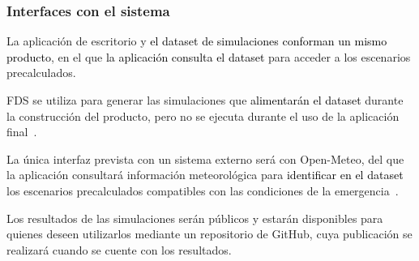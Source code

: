 \subsubsection{Interfaces con el sistema}{\color{black}La aplicación de escritorio y \textcolor{black}{el dataset de simulaciones conforman un mismo producto}, en el que \textcolor{black}{la aplicación consulta el dataset} para acceder a los escenarios precalculados.

FDS se utiliza para generar las simulaciones que \textcolor{black}{alimentarán el dataset} durante la construcción del producto, pero no se ejecuta durante el uso de la aplicación final~\cite{vfp2026}.

La única interfaz prevista con un sistema externo será con Open-Meteo, del que la aplicación consultará información meteorológica para \textcolor{black}{identificar en el dataset} los escenarios precalculados compatibles con las condiciones de la emergencia~\cite{vfp2026}.

Los resultados de las simulaciones serán públicos y estarán disponibles para quienes deseen utilizarlos mediante un repositorio de GitHub, cuya publicación se realizará cuando se cuente con los resultados.
}
